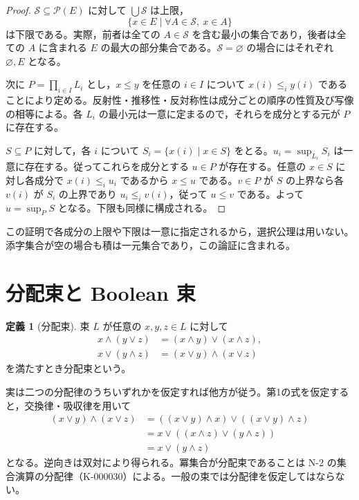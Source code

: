 \documentclass[a5paper,10pt,dvipdfmx]{jsarticle}
\theoremstyle{definition}
\newtheorem{defn}[ruledef]{定義}
\theoremstyle{plain}
\newcommand{\Pow}{\mathcal{P}}
\begin{document}
\begin{proof}
$\mathcal S\subseteq\Pow(E)$ に対して $\bigcup\mathcal S$ は上限，
\[
 \{x\in E\mid\forall A\in\mathcal S,\ x\in A\}
\]
は下限である。実際，前者は全ての $A\in\mathcal S$ を含む最小の集合であり，後者は全ての $A$ に含まれる $E$ の最大の部分集合である。$\mathcal S=\varnothing$ の場合にはそれぞれ $\varnothing,E$ となる。

次に $P=\prod_{i\in I}L_i$ とし，$x\leq y$ を任意の $i\in I$ について $x(i)\leq_i y(i)$ であることにより定める。反射性・推移性・反対称性は成分ごとの順序の性質及び写像の相等による。各 $L_i$ の最小元は一意に定まるので，それらを成分とする元が $P$ に存在する。

$S\subseteq P$ に対して，各 $i$ について $S_i=\{x(i)\mid x\in S\}$ をとる。$u_i=\sup_{L_i} S_i$ は一意に存在する。従ってこれらを成分とする $u\in P$ が存在する。任意の $x\in S$ に対し各成分で $x(i)\leq_i u_i$ であるから $x\leq u$ である。$v\in P$ が $S$ の上界なら各 $v(i)$ が $S_i$ の上界であり $u_i\leq_i v(i)$，従って $u\leq v$ である。よって $u=\sup_P S$ となる。下限も同様に構成される。
\end{proof}
この証明で各成分の上限や下限は一意に指定されるから，選択公理は用いない。添字集合が空の場合も積は一元集合であり，この論証に含まれる。
\section{分配束と Boolean 束}
\begin{defn}[分配束]\label{k88}
束 $L$ が任意の $x,y,z\in L$ に対して
\begin{align*}
 x\wedge(y\vee z)&=(x\wedge y)\vee(x\wedge z),\\
 x\vee(y\wedge z)&=(x\vee y)\wedge(x\vee z)
\end{align*}
を満たすとき分配束という。
\end{defn}
実は二つの分配律のうちいずれかを仮定すれば他方が従う。第1の式を仮定すると，交換律・吸収律を用いて
\begin{align*}
 (x\vee y)\wedge(x\vee z)
 &=((x\vee y)\wedge x)\vee((x\vee y)\wedge z)\\
 &=x\vee((x\wedge z)\vee(y\wedge z))\\
 &=x\vee(y\wedge z)
\end{align*}
となる。逆向きは双対により得られる。冪集合が分配束であることは N-2 の集合演算の分配律（K-000030）による。一般の束では分配律を仮定してはならない。
\end{document}
